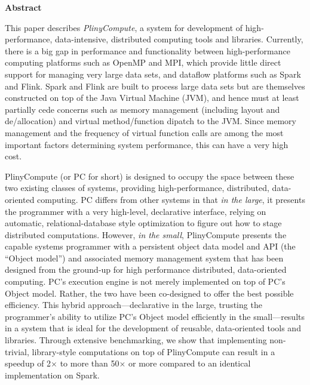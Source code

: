 
\noindent
\textbf{Abstract}

\noindent
This paper describes \emph{PlinyCompute}, a system for development of
high-performance, data-intensive, distributed computing tools and libraries.
Currently, there is a big gap in performance and functionality between 
high-performance computing platforms such as OpenMP and MPI, which provide little direct support for
managing very large data sets, and dataflow platforms such as Spark and Flink.  Spark and Flink
are built to process large data sets but are themselves constructed on top of the
Java Virtual Machine (JVM), and hence must
at least partially cede concerns such as 
memory management (including layout and de/allocation) and virtual method/function dipatch to the JVM. Since memory management 
and the frequency of virtual function calls are
among the most important factors determining system performance,
this can have a very high cost.

PlinyCompute (or PC for short) is designed to occupy the space between these two 
existing classes of systems, providing high-performance, distributed, data-oriented computing.
PC differs from other systems in that \emph{in the large}, it presents the programmer with a very high-level,
declarative interface, relying on automatic, relational-database style optimization to figure out how to stage
distributed computations.  However, \emph{in the small}, PlinyCompute presents the capable systems programmer with a
persistent object data model and API (the ``Object model'') and associated memory management system
that has been designed from the ground-up for
high performance distributed, data-oriented computing.
PC's execution engine is not merely implemented on top of
PC's Object model.  Rather, the two have been co-designed to offer the best possible efficiency.
This hybrid approach---declarative in the large, trusting the programmer's ability
to utilize PC's Object model efficiently
in the small---results in a system that is ideal for the development of reusable, data-oriented tools and libraries.
Through extensive benchmarking, we show that implementing non-trivial, library-style computations 
on top of PlinyCompute can result in a speedup of 2$\times$ to
more than 
50$\times$ or more compared to an identical implementation on Spark.
